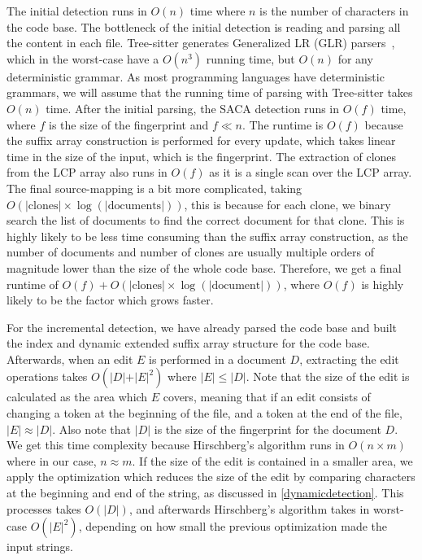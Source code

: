 The initial detection runs in $O(n)$ time where $n$ is the number of characters in the
code base. The bottleneck of the initial detection is reading and parsing all the content
in each file. Tree-sitter generates Generalized LR (GLR) parsers~\cite{GLR}, which in the
worst-case have a $O(n^3)$ running time, but $O(n)$ for any deterministic grammar. As most
programming languages have deterministic grammars, we will assume that the running time of
parsing with Tree-sitter takes $O(n)$ time. After the initial parsing, the SACA detection
runs in $O(f)$ time, where $f$ is the size of the fingerprint and $f \ll n$. The runtime
is $O(f)$ because the suffix array construction is performed for every update, which takes
linear time in the size of the input, which is the fingerprint. The extraction of clones
from the LCP array also runs in $O(f)$ as it is a single scan over the LCP array. The
final source-mapping is a bit more complicated, taking $O(\vert\text{clones}\vert \times
\log (\vert\text{documents}\vert))$, this is because for each clone, we binary search the
list of documents to find the correct document for that clone. This is highly likely to be
less time consuming than the suffix array construction, as the number of documents and
number of clones are usually multiple orders of magnitude lower than the size of the whole
code base. Therefore, we get a final runtime of $O(f) + O(\vert\text{clones}\vert \times
\log(\vert\text{document}\vert))$, where $O(f)$ is highly likely to be the factor which
grows faster.

For the incremental detection, we have already parsed the code base and built the index
and dynamic extended suffix array structure for the code base. Afterwards, when an edit
$E$ is performed in a document $D$, extracting the edit operations takes $O(\vert D\vert +
\vert E\vert^2)$ where $\vert E\vert \leq \vert D\vert$. Note that the size of the edit is
calculated as the area which $E$ covers, meaning that if an edit consists of changing a
token at the beginning of the file, and a token at the end of the file, $\vert E\vert
\approx \vert D\vert$. Also note that $\vert D\vert$ is the size of the fingerprint for
the document $D$. We get this time complexity because Hirschberg's algorithm runs in $O(n
\times m)$ where in our case, $n \approx m$. If the size of the edit is contained in a
smaller area, we apply the optimization which reduces the size of the edit by comparing
characters at the beginning and end of the string, as discussed in
\cref{dynamicdetection}. This processes takes $O(\vert D\vert)$, and afterwards
Hirschberg's algorithm takes in worst-case $O(\vert E\vert^2)$, depending on how small the
previous optimization made the input strings.


